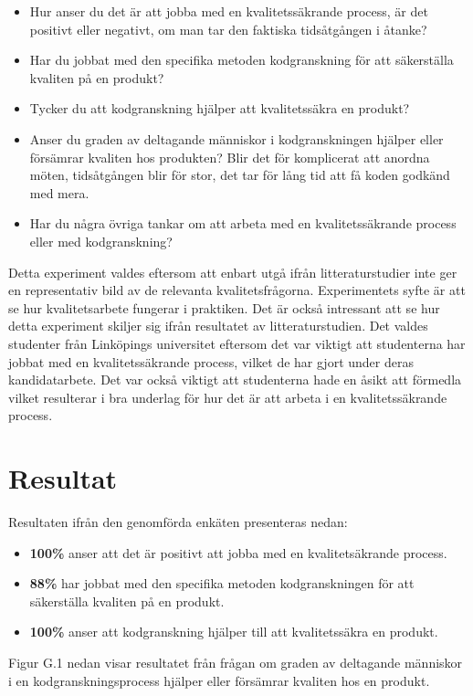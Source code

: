\begin{itemize}
	\item Hur anser du det är att jobba med en kvalitetssäkrande process, är det positivt eller negativt, om man tar den faktiska tidsåtgången i åtanke?
	\item Har du jobbat med den specifika metoden kodgranskning för att säkerställa kvaliten på en produkt?
	\item Tycker du att kodgranskning hjälper att kvalitetssäkra en produkt?
	\item Anser du graden av deltagande människor i kodgranskningen hjälper eller försämrar kvaliten hos produkten? Blir det för komplicerat att anordna möten, tidsåtgången blir för stor, det tar för lång tid att få koden godkänd med mera.
	\item Har du några övriga tankar om att arbeta med en kvalitetssäkrande process eller med kodgranskning?
\end{itemize}

Detta experiment valdes eftersom att enbart utgå ifrån litteraturstudier inte ger en representativ bild av de relevanta kvalitetsfrågorna. Experimentets syfte är att se hur kvalitetsarbete fungerar i praktiken. Det är också intressant att se hur detta experiment skiljer sig ifrån resultatet av litteraturstudien. Det valdes studenter från Linköpings universitet eftersom det var viktigt att studenterna har jobbat med en kvalitetssäkrande process, vilket de har gjort under deras kandidatarbete. Det var också viktigt att studenterna hade en åsikt att förmedla vilket resulterar i bra underlag för hur det är att arbeta i en kvalitetssäkrande process. 

\section{Resultat}
\label{sec:results-wallstrom}

Resultaten ifrån den genomförda enkäten presenteras nedan:

\begin{itemize}
	\item \textbf{100\%} anser att det är positivt att jobba med en kvalitetsäkrande process.
	\item \textbf{88\%} har jobbat med den specifika metoden kodgranskningen för att säkerställa kvaliten på en produkt.
	\item \textbf{100\%} anser att kodgranskning hjälper till att kvalitetssäkra en produkt.
\end{itemize}
Figur G.1 nedan visar resultatet från frågan om graden av deltagande människor i en kodgranskningsprocess hjälper eller försämrar kvaliten hos en produkt.


